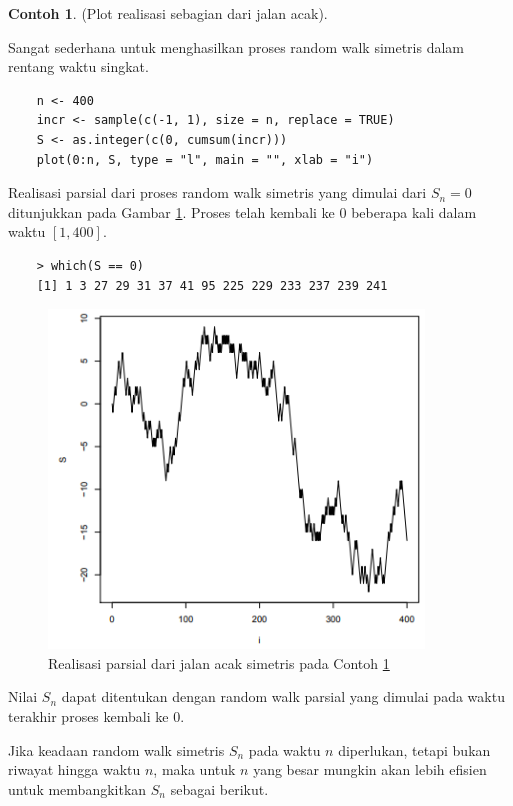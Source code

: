 \documentclass[a4paper,12pt]{article}
\theoremstyle{definition}
\newtheorem{example}{Contoh}[section]
\begin{document}
\begin{example} \label{K1C5} (Plot realisasi sebagian dari jalan acak).

Sangat sederhana untuk menghasilkan proses random walk simetris dalam rentang waktu singkat.

    \begin{lstlisting}
    n <- 400
    incr <- sample(c(-1, 1), size = n, replace = TRUE)
    S <- as.integer(c(0, cumsum(incr)))
    plot(0:n, S, type = "l", main = "", xlab = "i")
    \end{lstlisting}
    
Realisasi parsial dari proses random walk simetris yang dimulai dari $S_n = 0$ ditunjukkan pada Gambar \ref{K1G2}. Proses telah kembali ke 0 beberapa kali dalam waktu $[1, 400]$.

    \begin{lstlisting}
    > which(S == 0)
    [1] 1 3 27 29 31 37 41 95 225 229 233 237 239 241
    \end{lstlisting}
    
    

\begin{figure}[H]
    \centering
    \includegraphics[height=9cm]{gb/K1G2.png}
    \caption{Realisasi parsial dari jalan acak simetris pada Contoh \ref{K1C5}}
    \label{K1G2}
\end{figure}

Nilai $S_n$ dapat ditentukan dengan random walk parsial yang dimulai pada waktu terakhir proses kembali ke 0.

Jika keadaan random walk simetris $S_n$ pada waktu $n$ diperlukan, tetapi bukan riwayat hingga waktu $n$, maka untuk $n$ yang besar mungkin akan lebih efisien untuk membangkitkan $S_n$ sebagai berikut.


\end{example}
\end{document}
